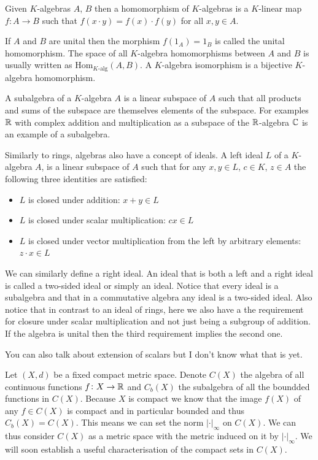 \documentclass[11pt,a4paper]{article}
\begin{document}
\begin{definition}
  Given $K$-algebras $A$, $B$ then a homomorphism of $K$-algebras
  is a $K$-linear map $f \colon A \to B$ such that 
  $f(x \cdot y)=f(x) \cdot f(y)$ for all $x,y \in A$.
\end{definition}
\begin{remark}
  If $A$ and $B$ are unital then the morphism
  $f(1_A) = 1_B$ is called the unital homomorphism. The space
  of all $K$-algebra homomorphisms between $A$ and $B$ is usually 
  written as ${\mathrm{Hom}}_{K\text{-alg}}(A,B)$. A $K$-algebra
  isomorphism is a bijective $K$-algebra homomorphism.
\end{remark}
A subalgebra of a $K$-algebra $A$ is a linear subspace of $A$ such
that all products and sums of the subspace are themselves elements
of the subspace. For examples $\mathbb{R}$ with complex addition and 
multiplication as a subspace of the $\mathbb{R}$-algebra $\mathbb{C}$ is an example
of a subalgebra.

Similarly to rings, algebras also have a concept of ideals. A left ideal
$L$ of a $K$-algebra $A$, is a linear subspace of $A$ such that for
any $x,y \in L$, $c \in K$, $z \in A$ the following three identities
are satisfied:
\begin{itemize}
  \item $L$ is closed under addition: $x + y \in L$
  \item $L$ is closed under scalar multiplication: $cx \in L$
  \item $L$ is closed under vector multiplication from the left
  by arbitrary elements: $z \cdot x \in L$
\end{itemize}
We can similarly define a right ideal. An ideal that is both a left and
a right ideal is called a two-sided ideal or simply an ideal. Notice
that every ideal is a subalgebra and that in a commutative algebra
any ideal is a two-sided ideal. Also notice that in contrast to an
ideal of rings, here we also have a the requirement for closure under
scalar multiplication and not just being a subgroup of addition.
If the algebra is unital then the third requirement implies the second
one.

You can also talk about extension of scalars but I don't know what
that is yet.

Let $(X,d)$ be a fixed compact metric space. Denote $C(X)$ the algebra
of all continuous functions $f \colon X \to \mathbb{R}$ and $C_b(X)$ the
subalgebra of all the boundded functions in $C(X)$. Because $X$
is compact we know that the image $f(X)$ of any $f \in C(X)$ is compact
and in particular bounded and thus $C_b(X) = C(X)$. This means we can set 
the norm $|\cdot|_\infty$ on $C(X)$. We can thus consider $C(X)$ as
a metric space with the metric induced on it by $|\cdot|_\infty$.
We will soon establish a useful characterisation of the compact sets
in $C(X)$.
\end{document}
